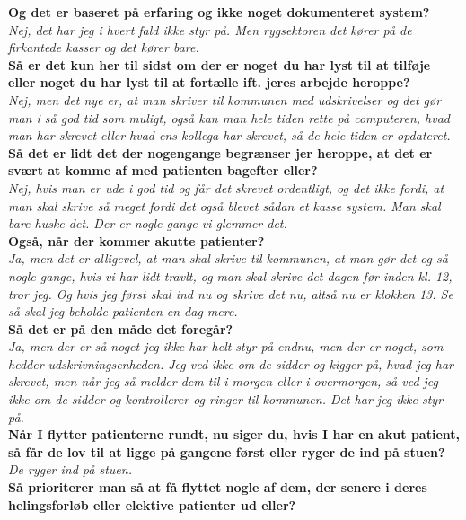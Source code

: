 \noindent
\textbf{Og det er baseret på erfaring og ikke noget dokumenteret system?}\\
\noindent
\textit{Nej, det har jeg i hvert fald ikke styr på. Men rygsektoren det kører på de firkantede kasser og det kører bare.}\\
\noindent
\textbf{Så er det kun her til sidst om der er noget du har lyst til at tilføje eller noget du har lyst til at fortælle ift. jeres arbejde heroppe?}\\
\noindent
\textit{Nej, men det nye er, at man skriver til kommunen med udskrivelser og det gør man i så god tid som muligt, også kan man hele tiden rette på computeren, hvad man har skrevet eller hvad ens kollega har skrevet, så de hele tiden er opdateret.}\\
\noindent
\textbf{Så det er lidt det der nogengange begrænser jer heroppe, at det er svært at komme af med patienten bagefter eller?}\\
\noindent
\textit{Nej, hvis man er ude i god tid og får det skrevet ordentligt, og det ikke fordi, at man skal skrive så meget fordi det også blevet sådan et kasse system. Man skal bare huske det. Der er nogle gange vi glemmer det.}\\
\noindent
\textbf{Også, når der kommer akutte patienter?}\\
\noindent
\textit{Ja, men det er alligevel, at man skal skrive til kommunen, at man gør det og så nogle gange, hvis vi har lidt travlt, og man skal skrive det dagen før inden kl. 12, tror jeg. Og hvis jeg først skal ind nu og skrive det nu, altså nu er klokken 13. Se så skal jeg beholde patienten en dag mere.}\\
\noindent
\textbf{Så det er på den måde det foregår?}\\
\noindent
\textit{Ja, men der er så noget jeg ikke har helt styr på endnu, men der er noget, som hedder udskrivningsenheden. Jeg ved ikke om de sidder og kigger på, hvad jeg har skrevet, men når jeg så melder dem til i morgen eller i overmorgen, så ved jeg ikke om de sidder og kontrollerer og ringer til kommunen. Det har jeg ikke styr på.}\\
\noindent
\textbf{Når I flytter patienterne rundt, nu siger du, hvis I har en akut patient, så får de lov til at ligge på gangene først eller ryger de ind på stuen?}\\
\noindent
\textit{De ryger ind på stuen.}\\
\noindent
\textbf{Så prioriterer man så at få flyttet nogle af dem, der senere i deres helingsforløb eller elektive patienter ud eller?}\\
